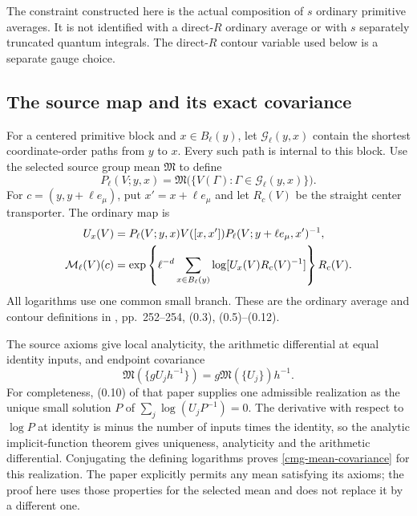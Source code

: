 \documentclass[11pt]{article}
\theoremstyle{remark}
\begin{document}
The constraint constructed here is the actual composition of $s$
ordinary primitive averages. It is not identified with a direct-$R$
ordinary average or with $s$ separately truncated quantum integrals.
The direct-$R$ contour variable used below is a separate gauge choice.

\subsection{The source map and its exact covariance}
\label{cmg-source-section}

For a centered primitive block and $x\in B_\ell(y)$, let
$\mathcal G_\ell(y,x)$ contain the shortest coordinate-order paths
from $y$ to $x$. Every such path is internal to this block. Use the
selected source group mean $\mathfrak M$ to define
\begin{equation}
 P_\ell(V;y,x)=
 \mathfrak M\bigl(\{V(\Gamma):\Gamma\in\mathcal G_\ell(y,x)\}\bigr).
 \label{cmg-contour}
\end{equation}
For $c=(y,y+\ell e_\mu)$, put $x'=x+\ell e_\mu$ and let
$R_c(V)$ be the straight center transporter. The ordinary map is
\begin{align}
 U_x(V)&=P_\ell(V;y,x)V([x,x'])P_\ell(V;y+\ell e_\mu,x')^{-1},
 \notag\\
 \mathcal M_\ell(V)(c)
 &=\exp\left\{\ell^{-d}\sum_{x\in B_\ell(y)}
          \log[U_x(V)R_c(V)^{-1}]\right\}R_c(V).
 \label{cmg-ordinary}
\end{align}
All logarithms use one common small branch. These are the ordinary
average and contour definitions in \cite{balaban109cm}, pp.~252--254,
(0.3), (0.5)--(0.12).

The source axioms give local analyticity, the arithmetic differential
at equal identity inputs, and endpoint covariance
\begin{equation}
 \mathfrak M(\{gU_jh^{-1}\})=
 g\mathfrak M(\{U_j\})h^{-1}.
 \label{cmg-mean-covariance}
\end{equation}
For completeness, (0.10) of that paper supplies one admissible
realization as the unique small solution $P$ of
$\sum_j\log(U_jP^{-1})=0$. The derivative with respect to $\log P$ at
identity is minus the number of inputs times the identity, so the
analytic implicit-function theorem gives uniqueness, analyticity and
the arithmetic differential. Conjugating the defining logarithms
proves \eqref{cmg-mean-covariance} for this realization. The paper
explicitly permits any mean satisfying its axioms; the proof here
uses those properties for the selected mean and does not replace it
by a different one.
\end{document}

